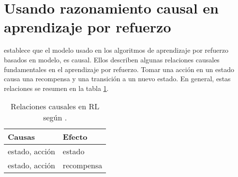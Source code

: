 \section{Usando razonamiento causal en aprendizaje por refuerzo}


\citet{Gershman2017} establece que el modelo usado en los algoritmos de aprendizaje por refuerzo basados en modelo, es causal.
Ellos describen algunas relaciones causales fundamentales en el aprendizaje por refuerzo. Tomar una acción en un estado causa una recompensa y una transición a un nuevo estado.
En general, estas relaciones se resumen en la tabla \ref{table:causal-relationships}.

\begin{table}[h]
\centering
\caption{Relaciones causales en RL según \cite{Gershman2017}.}
\label{table:causal-relationships}
\begin{tabular}{@{}ll@{}}
\toprule
Causas         & Efecto     \\ \midrule
estado, acción & estado     \\
estado, acción & recompensa \\ \bottomrule
\end{tabular}
\end{table}




